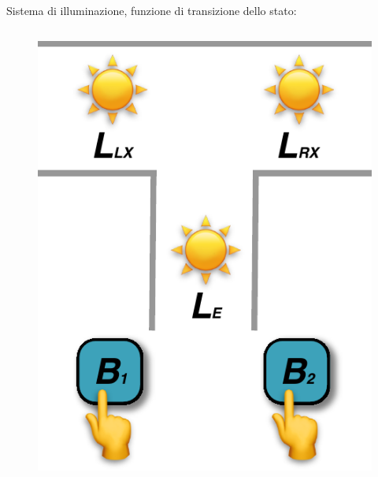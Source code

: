 \begin{frame}
\begin{block}{Sistema di illuminazione, funzione di transizione dello stato:}
\begin{columns}
		\begin{figure}[!htbp]
			\centering
			\includegraphics[width=0.80\linewidth]{images/1_i_sistemi/sistemaLight.pdf}
		\end{figure}
	\end{columns}
	\end{block}
\end{frame}




